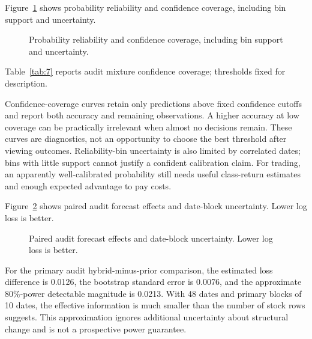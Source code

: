 \noindent Figure~\ref{fig:5} shows probability reliability and confidence coverage, including bin support and uncertainty.

\begin{figure}[htbp]\centering

\caption{Probability reliability and confidence coverage, including bin support and uncertainty.}\label{fig:5}
\end{figure}

\noindent Table~\ref{tab:7} reports audit mixture confidence coverage; thresholds fixed for description.



Confidence-coverage curves retain only predictions above fixed confidence cutoffs and report both accuracy and remaining observations. A higher accuracy at low coverage can be practically irrelevant when almost no decisions remain. These curves are diagnostics, not an opportunity to choose the best threshold after viewing outcomes. Reliability-bin uncertainty is also limited by correlated dates; bins with little support cannot justify a confident calibration claim. For trading, an apparently well-calibrated probability still needs useful class-return estimates and enough expected advantage to pay costs.

\noindent Figure~\ref{fig:6} shows paired audit forecast effects and date-block uncertainty. Lower log loss is better.

\begin{figure}[htbp]\centering

\caption{Paired audit forecast effects and date-block uncertainty. Lower log loss is better.}\label{fig:6}
\end{figure}

For the primary audit hybrid-minus-prior comparison, the estimated loss difference is 0.0126, the bootstrap standard error is 0.0076, and the approximate 80\%-power detectable magnitude is 0.0213. With 48 dates and primary blocks of 10 dates, the effective information is much smaller than the number of stock rows suggests. This approximation ignores additional uncertainty about structural change and is not a prospective power guarantee.
